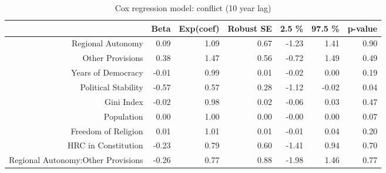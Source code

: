 \begin{table}[ht]
\centering
\begin{tabular}{rrrrrrr}
  \hline
 & Beta & Exp(coef) & Robust SE & 2.5 \% & 97.5 \% & p-value \\ 
  \hline
Regional Autonomy & 0.09 & 1.09 & 0.67 & -1.23 & 1.41 & 0.90 \\ 
  Other Provisions & 0.38 & 1.47 & 0.56 & -0.72 & 1.49 & 0.49 \\ 
  Years of Democracy & -0.01 & 0.99 & 0.01 & -0.02 & 0.00 & 0.19 \\ 
  Political Stability & -0.57 & 0.57 & 0.28 & -1.12 & -0.02 & 0.04 \\ 
  Gini Index & -0.02 & 0.98 & 0.02 & -0.06 & 0.03 & 0.47 \\ 
  Population & 0.00 & 1.00 & 0.00 & -0.00 & 0.00 & 0.07 \\ 
  Freedom of Religion & 0.01 & 1.01 & 0.01 & -0.01 & 0.04 & 0.20 \\ 
  HRC in Constitution & -0.23 & 0.79 & 0.60 & -1.41 & 0.94 & 0.70 \\ 
  Regional Autonomy:Other Provisions & -0.26 & 0.77 & 0.88 & -1.98 & 1.46 & 0.77 \\ 
   \hline
\end{tabular}
\caption{Cox regression model: conflict (10 year lag)} 
\end{table}
